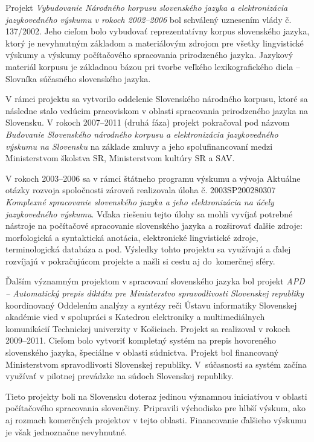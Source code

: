 \begin{multicols}{2}
Projekt \emph{Vybudovanie Národného korpusu slovenského jazyka a elektronizácia jazykovedného výskumu v rokoch 2002--2006} bol schválený uznesením vlády č. 137/2002. Jeho cieľom bolo vybudovať reprezentatívny korpus slovenského jazyka, ktorý je nevyhnutným základom a materiálovým zdrojom pre všetky lingvistické výskumy a výskumy počítačového spracovania prirodzeného jazyka. Jazykový materiál korpusu je základnou bázou pri tvorbe veľkého lexikografického diela -- Slovníka súčasného slovenského jazyka. 

V rámci projektu sa vytvorilo oddelenie Slovenského národného korpusu, ktoré sa následne stalo vedúcim pracoviskom v oblasti spracovania prirodzeného jazyka na Slovensku. V rokoch 2007--2011 (druhá fáza) projekt pokračoval pod názvom \emph{Budovanie Slovenského národného korpusu a elektronizácia jazykovedného výskumu na Slovensku} na základe zmluvy a jeho spolufinancovaní medzi Ministerstvom školstva SR, Ministerstvom kultúry SR a SAV.

V rokoch 2003--2006 sa v rámci štátneho programu výskumu a vývoja Aktuálne otázky rozvoja spoločnosti zároveň realizovala úloha č. 2003SP200280307 \emph{Komplexné spracovanie slovenského jazyka a jeho elektronizácia na účely jazykovedného výskumu}. Vďaka riešeniu tejto úlohy sa mohli vyvíjať potrebné nástroje na počítačové spracovanie slovenského jazyka a rozširovať ďalšie zdroje: morfologická a syntaktická anotácia, elektronické lingvistické zdroje, terminologická databáza a pod. Výsledky tohto projektu sa využívajú a ďalej rozvíjajú v pokračujúcom projekte a našli si cestu aj do~komerčnej sféry.

Ďalším významným projektom v spracovaní slovenského jazyka bol projekt \emph{APD
--  Automatický prepis diktátu pre Ministerstvo spravodlivosti Slovenskej
republiky} koordinovaný Oddelením analýzy a syntézy reči Ústavu informatiky
Slovenskej akadémie vied v spolupráci s Katedrou elektroniky a multimediálnych
komunikácií Technickej univerzity v Košiciach. Projekt sa realizoval v rokoch
2009--2011. Cieľom bolo vytvoriť kompletný systém na prepis hovoreného
slovenského jazyka, špeciálne v oblasti súdnictva. Projekt bol financovaný
Ministerstvom spravodlivosti Slovenskej republiky. V~súčasnosti sa systém začína
využívať v pilotnej prevádzke na súdoch Slovenskej republiky.

Tieto projekty boli na Slovensku doteraz jedinou významnou iniciatívou v oblasti počítačového spracovania slovenčiny. Pripravili východisko pre hlbší výskum, ako aj rozmach komerčných projektov v tejto oblasti. Financovanie ďalšieho výskumu je však jednoznačne nevyhnutné. 



\end{multicols}
